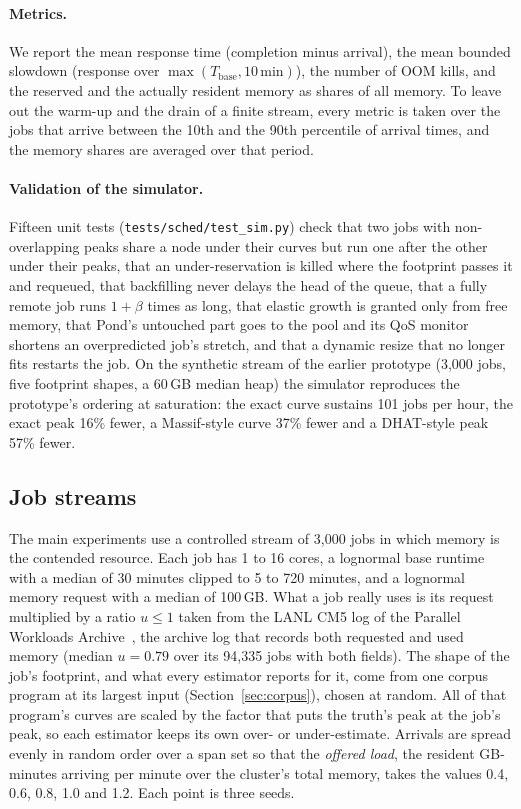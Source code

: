 \documentclass[11pt]{article}
\newcommand{\secref}[1]{Section~\ref{#1}}
\newcommand{\term}[1]{\emph{#1}}
\begin{document}
\paragraph{Metrics.} We report the mean response time (completion minus arrival), the mean bounded slowdown
(response over $\max(T_{\mathrm{base}}, 10\,\mathrm{min})$), the number of OOM kills, and the reserved and the
actually resident memory as shares of all memory. To leave out the warm-up and the drain of a finite stream,
every metric is taken over the jobs that arrive between the 10th and the 90th percentile of arrival times,
and the memory shares are averaged over that period.

\paragraph{Validation of the simulator.} Fifteen unit tests (\texttt{tests/sched/test\_sim.py}) check that two jobs
with non-overlapping peaks share a node under their curves but run one after the other under their peaks, that
an under-reservation is killed where the footprint passes it and requeued, that backfilling never delays the
head of the queue, that a fully remote job runs $1 + \beta$ times as long, that elastic growth is granted
only from free memory, that Pond's untouched part goes to the pool and its QoS monitor shortens an
overpredicted job's stretch, and that a dynamic resize that no longer fits restarts the job. On the synthetic stream of the earlier prototype (3{,}000 jobs, five footprint shapes,
a 60\,GB median heap) the simulator reproduces the prototype's ordering at saturation: the exact curve sustains
101 jobs per hour, the exact peak 16\% fewer, a Massif-style curve 37\% fewer and a DHAT-style peak 57\% fewer.

\subsection{Job streams}
\label{sec:streams}

The main experiments use a controlled stream of 3{,}000 jobs in which memory is the contended resource. Each
job has 1 to 16 cores, a lognormal base runtime with a median of 30 minutes clipped to 5 to 720 minutes, and a
lognormal memory request with a median of 100\,GB. What a job really uses is its request multiplied by a ratio
$u \le 1$ taken from the LANL CM5 log of the Parallel Workloads Archive~\cite{PWA}, the archive log that records
both requested and used memory (median $u = 0.79$ over its 94{,}335 jobs with both fields). The shape of the job's
footprint, and what every estimator reports for it, come from one corpus program at its largest input
(\secref{sec:corpus}), chosen at random. All of that program's curves are scaled by the factor that puts the
truth's peak at the job's peak, so each estimator keeps its own over- or under-estimate. Arrivals are spread
evenly in random order over a span set so that the \term{offered load}, the resident GB-minutes arriving per
minute over the cluster's total memory, takes the values 0.4, 0.6, 0.8, 1.0 and 1.2. Each point is three
seeds.
\end{document}
